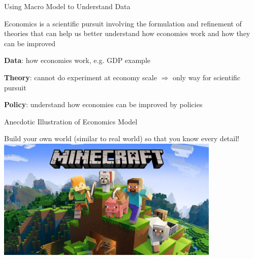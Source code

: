 \documentclass[11pt,aspectratio=169,usenames,dvipsnames]{beamer}
\let\tempone\itemize
\let\temptwo\enditemize
\renewenvironment{itemize}{\tempone\addtolength{\itemsep}{\fill}}{\temptwo}
\begin{document}
\begin{frame}{Using Macro Model to Understand Data}
\label{slide:Using_Macro_Model_to_Understand_Data}
    \begin{itemize}
        \item Economics is a \alert{scientific pursuit} involving the formulation and \alert{refinement of theories} that can help us better understand \alert{how economies work} and \alert{how they can be improved}
        \item \textbf{Data}: \alert{how economies work}, e.g. GDP example
        \item \textbf{Theory}: cannot do experiment at economy scale $ \Rightarrow  $ only way for \alert{scientific pursuit}
        \item \textbf{Policy}: understand \alert{how economies can be improved} by \alert{policies}
    \end{itemize}
\end{frame}

\begin{frame}{Anecdotic Illustration of Economics Model}
\label{slide:Anecdotic_Illustration_of_Economics_Model}

\begin{center}
Build your own world (similar to real world) so that you know every detail!
\includegraphics[width=0.8\textwidth]{./figures/6375692be499513c6f3be825_Minecraft-logo.png}
\end{center}

\end{frame}
\end{document}
